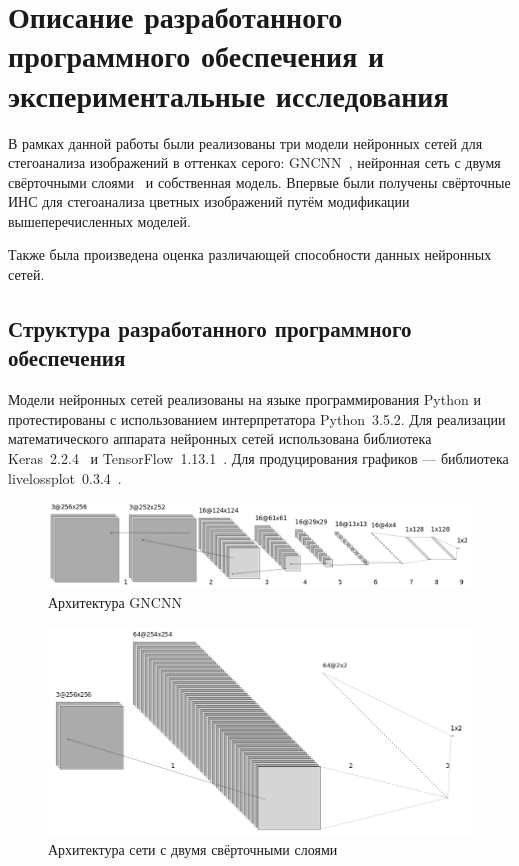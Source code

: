 
\section{Описание разработанного программного обеспечения и экспериментальные исследования}

В рамках данной работы были реализованы три модели нейронных сетей для стегоанализа изображений в оттенках серого: GNCNN~\cite{GNCNN}, нейронная сеть с двумя свёрточными слоями~\cite{FrenchCNN} и собственная модель. Впервые были получены свёрточные ИНС для стегоанализа цветных изображений путём модификации вышеперечисленных моделей.

Также была произведена оценка различающей способности данных нейронных сетей.

\subsection{Структура разработанного программного обеспечения}

Модели нейронных сетей реализованы на языке программирования Python и протестированы с использованием интерпретатора Python~3.5.2. Для реализации математического аппарата нейронных сетей использована библиотека Keras~2.2.4~\cite{Keras} и TensorFlow~1.13.1~\cite{TensorFlow}. Для продуцирования графиков --- библиотека livelossplot~0.3.4~\cite{livelossplot}.

\begin{figure}
\centering
\includegraphics[width=1\textwidth]{include/graphics/gncnn_color_architecture}
\caption{Архитектура GNCNN}
\label{fig:GNCNNArchitecture}
\end{figure}

\begin{figure}[!htb]
\centering
\includegraphics[width=1\textwidth]{include/graphics/french_color_architecture}
\caption{Архитектура сети с двумя свёрточными слоями}
\label{fig:FrenchCNNArchitecture}
\end{figure}


